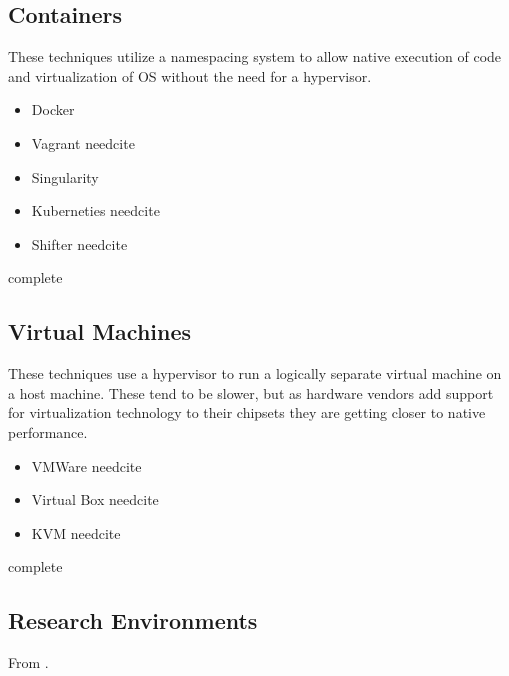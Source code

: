 \documentclass[american]{article}
\newcommand{\complete}{
	\gls{complete}
}
\newcommand{\needcite}{
	\gls{needcite}
}
\begin{document}
\subsection{Containers}

These techniques utilize a namespacing system to allow native execution of code and virtualization of OS without the need for a hypervisor.

\begin{itemize}
\item Docker \cite{Docker}
\item Vagrant \needcite
\item Singularity \cite{Singularity}
\item Kuberneties \needcite
\item Shifter \needcite
\end{itemize}

\complete

\subsection{Virtual Machines}

These techniques use a hypervisor to run a logically separate virtual machine on a host machine. These tend to be slower, but as hardware vendors add support for virtualization technology to their chipsets they are getting closer to native performance.

\begin{itemize}
\item VMWare \needcite
\item Virtual Box \needcite
\item KVM \needcite
\end{itemize}

\complete

\subsection{Research Environments}

From \cite{stodden-sharing-reproducibility-talk-2017}.
\end{document}
